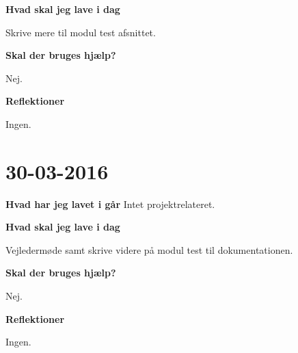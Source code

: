 \documentclass{article}
\begin{document}
	\textbf{Hvad skal jeg lave i dag}
	
	Skrive mere til modul test afsnittet.
	
	\textbf{Skal der bruges hjælp?}
	
	Nej.
	
	\textbf{Reflektioner}
	
	Ingen.
	
	\section{30-03-2016}
	
	\textbf{Hvad har jeg lavet i går}
	Intet projektrelateret.
	
	\textbf{Hvad skal jeg lave i dag}
	
	Vejledermøde samt skrive videre på modul test til dokumentationen.
	
	\textbf{Skal der bruges hjælp?}
	
	Nej.
	
	\textbf{Reflektioner}
	
	Ingen.
\end{document}

